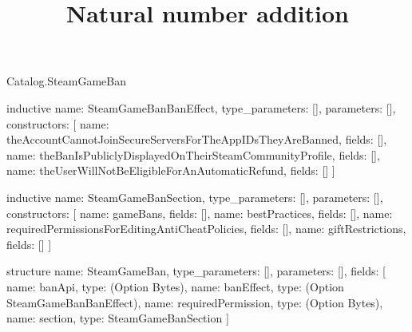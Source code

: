 \begin{lexlean}{Catalog.SteamGameBan}
\title{Natural number addition}
\begin{semanticmodule}
inductive{
  name: SteamGameBanBanEffect,
  type_parameters: [],
  parameters: [],
  constructors: [
    {name: theAccountCannotJoinSecureServersForTheAppIDsTheyAreBanned, fields: []},
    {name: theBanIsPubliclyDisplayedOnTheirSteamCommunityProfile, fields: []},
    {name: theUserWillNotBeEligibleForAnAutomaticRefund, fields: []}
  ]
}

inductive{
  name: SteamGameBanSection,
  type_parameters: [],
  parameters: [],
  constructors: [
    {name: gameBans, fields: []},
    {name: bestPractices, fields: []},
    {name: requiredPermissionsForEditingAntiCheatPolicies, fields: []},
    {name: giftRestrictions, fields: []}
  ]
}

structure{
  name: SteamGameBan,
  type_parameters: [],
  parameters: [],
  fields: [
    {name: banApi, type: (Option Bytes)},
    {name: banEffect, type: (Option SteamGameBanBanEffect)},
    {name: requiredPermission, type: (Option Bytes)},
    {name: section, type: SteamGameBanSection}
  ]
}
\end{semanticmodule}
\end{lexlean}
